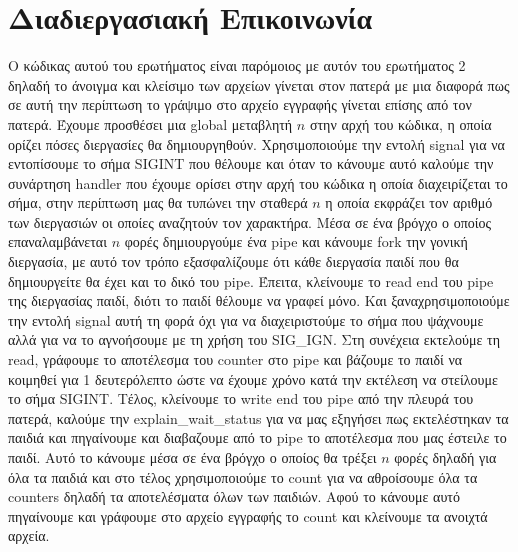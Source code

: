 \documentclass[12pt]{article}
\begin{document}
\section{Διαδιεργασιακή Επικοινωνία}
Ο κώδικας αυτού του ερωτήματος είναι παρόμοιος με αυτόν του ερωτήματος 2 δηλαδή
το άνοιγμα και κλείσιμο των αρχείων γίνεται στον πατερά με μια διαφορά πως σε
αυτή την περίπτωση το γράψιμο στο αρχείο εγγραφής γίνεται επίσης από τον
πατερά. Έχουμε προσθέσει μια \foreignlanguage{english}{global} μεταβλητή $n$
στην αρχή του κώδικα, η οποία
ορίζει πόσες διεργασίες θα δημιουργηθούν. Χρησιμοποιούμε την εντολή
\foreignlanguage{english}{signal} για
να εντοπίσουμε το σήμα \foreignlanguage{english}{SIGINT} που θέλουμε και όταν
το κάνουμε αυτό καλούμε την
συνάρτηση \foreignlanguage{english}{handler} που έχουμε ορίσει στην αρχή του
κώδικα η οποία διαχειρίζεται
το σήμα, στην περίπτωση μας θα τυπώνει την σταθερά $n$ η οποία εκφράζει τον
αριθμό των διεργασιών οι οποίες αναζητούν τον χαρακτήρα. Μέσα σε ένα βρόγχο ο
οποίος επαναλαμβάνεται $n$ φορές δημιουργούμε ένα
\foreignlanguage{english}{pipe} και κάνουμε \foreignlanguage{english}{fork} την
γονική διεργασία, με αυτό τον τρόπο εξασφαλίζουμε ότι κάθε διεργασία παιδί που
θα δημιουργείτε θα έχει και το δικό του \foreignlanguage{english}{pipe}. Έπειτα, κλείνουμε το \foreignlanguage{english}{read end} του
\foreignlanguage{english}{pipe} της διεργασίας παιδί, διότι το παιδί θέλουμε να γραφεί μόνο. Και
ξαναχρησιμοποιούμε την εντολή \foreignlanguage{english}{signal} αυτή τη φορά όχι για να διαχειριστούμε το
σήμα που ψάχνουμε αλλά για να το αγνοήσουμε με τη χρήση του \foreignlanguage{english}{SIG\_IGN}. Στη
συνέχεια εκτελούμε τη \foreignlanguage{english}{read}, γράφουμε το αποτέλεσμα του \foreignlanguage{english}{counter} στο \foreignlanguage{english}{pipe} και
βάζουμε το παιδί να κοιμηθεί για 1 δευτερόλεπτο ώστε να έχουμε χρόνο κατά την
εκτέλεση να στείλουμε το σήμα \foreignlanguage{english}{SIGINT}. Τέλος, κλείνουμε το \foreignlanguage{english}{write end} του \foreignlanguage{english}{pipe}
από την πλευρά του πατερά, καλούμε την \foreignlanguage{english}{explain\_wait\_status} για να μας
εξηγήσει
πως εκτελέστηκαν τα παιδιά και πηγαίνουμε και διαβαζουμε από το \foreignlanguage{english}{pipe} το
αποτέλεσμα που μας έστειλε το παιδί. Αυτό το κάνουμε μέσα σε ένα βρόγχο ο
οποίος θα τρέξει $n$ φορές δηλαδή για όλα τα παιδιά και στο τέλος χρησιμοποιούμε
το \foreignlanguage{english}{count} για να αθροίσουμε όλα τα \foreignlanguage{english}{counters} δηλαδή τα αποτελέσματα όλων των
παιδιών. Αφού το κάνουμε αυτό πηγαίνουμε και γράφουμε στο αρχείο εγγραφής το
\foreignlanguage{english}{count} και κλείνουμε τα ανοιχτά αρχεία.
\end{document}
